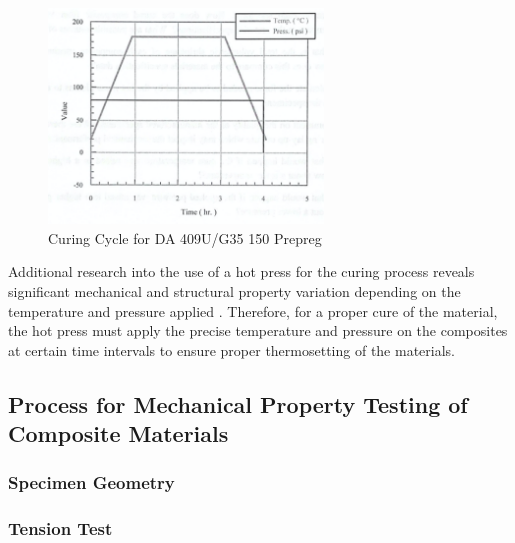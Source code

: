 \begin{figure}[!h]
    \centering
    \includegraphics[width=0.65\textwidth]{Pictures/Procedure/mariecuring.png}
    \caption{Curing Cycle for DA 409U/G35 150 Prepreg \cite{labmanual}}
    \label{fig:mariecuring}
\end{figure}

Additional research into the use of a hot press for the curing process reveals significant mechanical and structural property variation depending on the temperature and pressure applied \cite{curematters}.  Therefore, for a proper cure of the material, the hot press must apply the precise temperature and pressure on the composites at certain time intervals to ensure proper thermosetting of the materials.

\clearpage
\subsection{Process for Mechanical Property Testing of Composite Materials}
\subsubsection{Specimen Geometry}


\subsubsection{Tension Test}